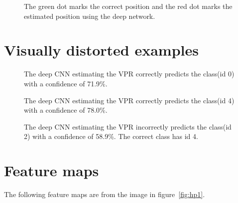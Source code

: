 \begin{figure}[H]
	\begin{center}
	\begin{scriptsize}
		\sffamily
		\def\svgwidth{0.9\textwidth}
		
	\end{scriptsize}
	\end{center}
	\caption[AR error examples visualised]{The green dot marks the correct position and the red dot marks the estimated position using the deep network.}
	\label{fig:aecollection}
\end{figure}

\section{Visually distorted examples}
\label{sec:vdexamples}
\begin{figure}[H]
	\begin{center}
	\begin{scriptsize}
		\sffamily
		
	\end{scriptsize}
	\end{center}
	\caption[Visually distorted example]{The deep CNN estimating the VPR correctly predicts the class(id 0) with a confidence of 71.9\%.}
	\label{fig:vd1}
\end{figure}

\begin{figure}[H]
	\begin{center}
	\begin{scriptsize}
		\sffamily
		
	\end{scriptsize}
	\end{center}
	\caption[Visually distorted example]{The deep CNN estimating the VPR correctly predicts the class(id 4) with a confidence of 78.0\%.}
	\label{fig:vd2}
\end{figure}

\begin{figure}[H]
	\begin{center}
	\begin{scriptsize}
		\sffamily
		
	\end{scriptsize}
	\end{center}
	\caption[Visually distorted example]{The deep CNN estimating the VPR incorrectly predicts the class(id 2) with a confidence of 58.9\%. The correct class has id 4.}
	\label{fig:vd3}
\end{figure}

\section{Feature maps}
\label{sec:featuremaps-appendix}
The following feature maps are from the image in figure~\ref{fig:hp1}.

